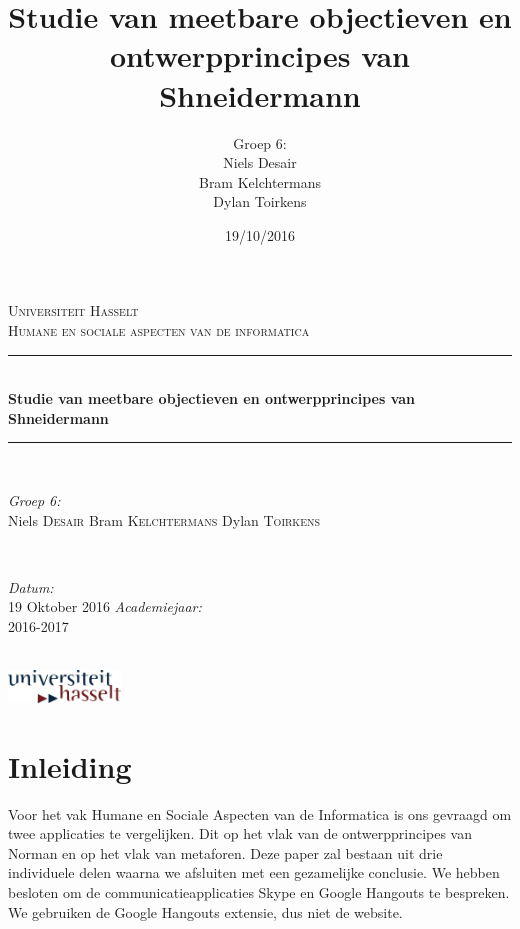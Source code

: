 \documentclass[11pt]{article}
\author{Groep 6:\\
		Niels Desair\\
		Bram Kelchtermans\\
		Dylan Toirkens}
\title{\textbf{Studie van meetbare objectieven en ontwerpprincipes van Shneidermann}}
\date{19/10/2016}
\begin{document}
	\begin{titlepage}
		
		\newcommand{\HRule}{\rule{\linewidth}{0.5mm}} %
		
		\begin{center} %
			
			\textsc{\LARGE Universiteit Hasselt}\\[1.5cm] %
			\textsc{\Large Humane en sociale aspecten van de informatica}\\[0.5cm] %
			
			\HRule \\[0.4cm]
			{ \huge \bfseries Studie van meetbare objectieven en ontwerpprincipes van Shneidermann}\\[0.4cm]
			\HRule \\[1.5cm]
			
			\begin{minipage}{0.4\textwidth}
				\begin{flushleft} \large
					\emph{Groep 6:}\\
					Niels \textsc{Desair} \newline
					Bram \textsc{Kelchtermans} \newline
					Dylan \textsc{Toirkens}
				\end{flushleft}
			\end{minipage}
			~
			\begin{minipage}{0.4\textwidth}
				\begin{flushright} \large
					\emph{Datum:}\\
					19 Oktober 2016
					\emph{Academiejaar: } \\
					2016-2017
				\end{flushright}
			\end{minipage}\\[4cm]
			\vspace{40 mm}
			\includegraphics[width=3.0cm]{uhasselt-logo}\\[2.0cm]  
		\end{center}
	\end{titlepage}

\tableofcontents
\newpage
\section{Inleiding}
Voor het vak Humane en Sociale Aspecten van de Informatica is ons gevraagd om twee applicaties te vergelijken. Dit op het vlak van de ontwerpprincipes van Norman en op het vlak van metaforen. Deze paper zal bestaan uit drie individuele delen waarna we afsluiten met een gezamelijke conclusie. We hebben besloten om de communicatieapplicaties Skype en Google Hangouts te bespreken. We gebruiken de Google Hangouts extensie, dus niet de website.
\newpage
\end{document}
